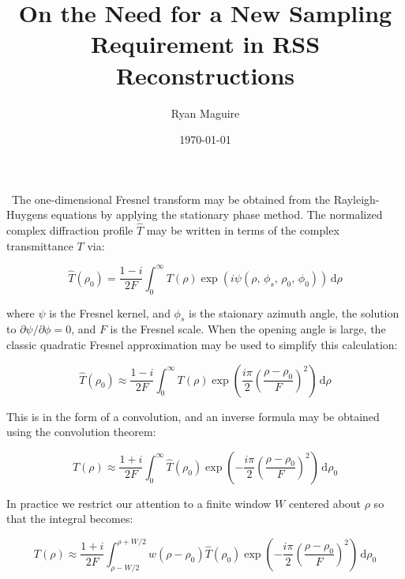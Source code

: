\documentclass{article}
\title{On the Need for a New Sampling Requirement in RSS Reconstructions}
\author{Ryan Maguire}
\date{\today}
\begin{document}
    \maketitle
\    The one-dimensional Fresnel transform may be obtained from the
    Rayleigh-Huygens equations by applying the stationary phase method.
    The normalized complex diffraction profile $\hat{T}$ may be written
    in terms of the complex transmittance $T$ via:

    \begin{equation}
        \hat{T}(\rho_{0})
        =
        \frac{1-i}{2F}
        \int_{0}^{\infty}
            T(\rho)
            \exp\left(
                i\psi(\rho,\,\phi_{s},\,\rho_{0},\,\phi_{0})
            \right)\,\textrm{d}\rho
    \end{equation}

    where $\psi$ is the Fresnel kernel, and $\phi_{s}$ is the staionary
    azimuth angle, the solution to $\partial\psi/\partial\phi=0$, and $F$
    is the Fresnel scale.
    When the opening angle is large, the classic quadratic Fresnel
    approximation may be used to simplify this calculation:

    \begin{equation}
        \hat{T}(\rho_{0})
            \approx
            \frac{1-i}{2F}
            \int_{0}^{\infty}
                T(\rho)
                \exp\left(
                    \frac{i\pi}{2}\left(
                        \frac{\rho-\rho_{0}}{F}
                    \right)^{2}
                \right)\,\textrm{d}\rho
    \end{equation}

    This is in the form of a convolution, and an inverse formula may be
    obtained using the convolution theorem:

    \begin{equation}
        T(\rho)
        \approx
        \frac{1+i}{2F}
        \int_{0}^{\infty}
            \hat{T}(\rho_{0})
            \exp\left(
                -\frac{i\pi}{2}\left(
                    \frac{\rho-\rho_{0}}{F}
                \right)^{2}
            \right)\,\textrm{d}\rho_{0}
    \end{equation}

    In practice we restrict our attention to a finite window $W$ centered
    about $\rho$ so that the integral becomes:

    \begin{equation}
        T(\rho)
        \approx
        \frac{1+i}{2F}
        \int_{\rho-W/2}^{\rho+W/2}
            w(\rho-\rho_{0})
            \hat{T}(\rho_{0})
            \exp\left(
                -\frac{i\pi}{2}\left(
                    \frac{\rho-\rho_{0}}{F}
                \right)^{2}
            \right)\,\textrm{d}\rho_{0}
    \end{equation}
\end{document}
